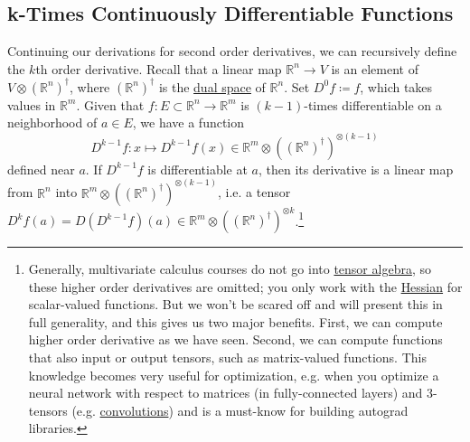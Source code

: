 \subsection{k-Times Continuously Differentiable Functions}

	Continuing our derivations for second order derivatives, we can recursively define the $k$th order derivative. Recall that a linear map $\mathbb{R}^n \to V$ is an element of $V \otimes (\mathbb{R}^n)^\dagger$, where $(\mathbb{R}^n)^\dagger$ is the \hyperref[lin-def:dual-space]{dual space} of $\mathbb{R}^n$. Set $D^0 f \coloneqq f$, which takes values in $\mathbb{R}^m$. Given that $f: E \subset \mathbb{R}^n \to \mathbb{R}^m$ is $(k-1)$-times differentiable on a neighborhood of $a \in E$, we have a function 
	\begin{equation}
		D^{k-1} f: x \mapsto D^{k-1} f(x) \in \mathbb{R}^m \otimes ((\mathbb{R}^n)^\dagger)^{\otimes (k-1)}
	\end{equation}
	defined near $a$. If $D^{k-1} f$ is differentiable at $a$, then its derivative is a linear map from $\mathbb{R}^n$ into $\mathbb{R}^m \otimes ((\mathbb{R}^n)^\dagger)^{\otimes (k-1)}$, i.e. a tensor $D^k f(a) = D(D^{k-1}f)(a) \in \mathbb{R}^m \otimes ((\mathbb{R}^n)^\dagger)^{\otimes k}$.\footnote{Generally, multivariate calculus courses do not go into \hyperref[lin-def:tensor-algebra]{tensor algebra}, so these higher order derivatives are omitted; you only work with the \hyperref[def:hessian]{Hessian} for scalar-valued functions. But we won't be scared off and will present this in full generality, and this gives us two major benefits. First, we can compute higher order derivative as we have seen. Second, we can compute functions that also input or output tensors, such as matrix-valued functions. This knowledge becomes very useful for optimization, e.g. when you optimize a neural network with respect to matrices (in fully-connected layers) and 3-tensors (e.g. \hyperref[real-thm:convolution]{convolutions}) and is a must-know for building autograd libraries. } 

